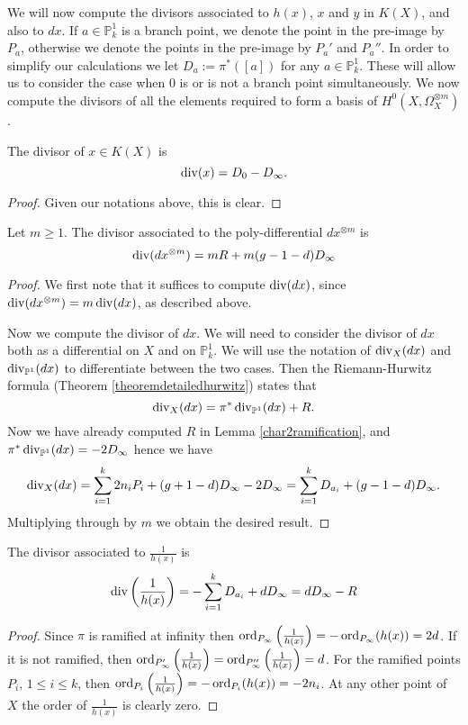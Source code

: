 We will now compute the divisors associated to $h(x)$, $x$ and $y$ in $K(X)$, and also to $dx$.
If $a\in \mathbb P_k^1$ is a branch point, we denote the point in the pre-image by $P_a$, otherwise we denote the points in the pre-image by $P_a'$ and $P_a''$.
In order to simplify our calculations we let $D_a := \pi^*([a])$ for any $a\in \mathbb P_k^1$.
These will allow us to consider the case when 0 is or is not a branch point simultaneously. 
We now compute the divisors of all the elements required to form a basis of $H^0(X,\Omega_X^{\otimes m})$.

    \begin{lem}\label{xchar2}
    The divisor of $x\in K(X)$ is 
        \[
        \operatorname{div} (x)= D_0 - D_\infty.
        \]
    \end{lem}
    \begin{proof}
    Given our notations above, this is clear.
    \end{proof}


    \begin{lem}\label{dxchar2}
    Let $m\geq 1$.
    The divisor associated to the poly-differential $dx^{\otimes m}$ is 
        \[
        \operatorname{div} (dx^{\otimes m}) =mR + m(g-1-d)D_\infty
        \]
    \end{lem}
    \begin{proof}
    We first note that it suffices to compute $\operatorname{div} (dx)$, since $\operatorname{div} (dx^{\otimes m}) = m\operatorname{div} (dx)$, as described above.
    
    Now we compute the divisor of $dx$.
    We will need to consider the divisor of $dx$ both as a differential on $X$ and on $\mathbb P_k^1$. 
    We will use the notation of $\operatorname{div}_X(dx)$ and $\operatorname{div}_{\mathbb P^1}(dx)$ to differentiate between the two cases.
    Then the Riemann-Hurwitz formula (Theorem \ref{theoremdetailedhurwitz}) states that
        \[
        \operatorname{div}_X( dx) = \pi^*\operatorname{div}_{\mathbb P^1}(dx) + R.
        \]
    Now we have already computed $R$ in Lemma \ref{char2ramification}, and $\pi^*\operatorname{div}_{\mathbb P^1}(dx) = -2D_\infty$ hence we have
        \[
        \operatorname{div}_X( dx) = \sum_{i=1}^k 2n_iP_i + (g+1-d)D_\infty - 2D_\infty = \sum_{i=1}^k D_{a_i} + (g-1-d)D_\infty.
        \]
    Multiplying through by $m$ we obtain the desired result.
    \end{proof}



    \begin{lem}\label{h(x)char2}
    The divisor associated to $\frac{1}{h(x)}$ is
        \[
        \operatorname{div} \left(\frac{1}{h(x)}\right) = - \sum_{i=1}^k D_{a_i} + dD_\infty = dD_\infty - R
        \]
    \end{lem}
    \begin{proof}
    Since $\pi$ is ramified at infinity then $\operatorname{ord}_{P_{\infty}}\left(\frac{1}{h(x)}\right) = -\operatorname{ord}_{P_{\infty}}(h(x)) = 2d$.
    If it is not ramified, then $\operatorname{ord}_{P_{\infty}'}\left(\frac{1}{h(x)}\right) = \operatorname{ord}_{P_{\infty}''}\left(\frac{1}{h(x)}\right)=d$.
    For the ramified points $P_i$, $1\leq i \leq k$, then $\operatorname{ord}_{P_i}\left(\frac{1}{h(x)}\right) = -\operatorname{ord}_{P_i}(h(x))= -2n_i$.
    At any other point of $X$ the order of $\frac{1}{h(x)}$ is clearly zero.
    \end{proof}

